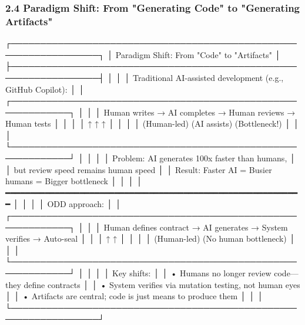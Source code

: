 \documentclass[
]{article}
\newenvironment{Shaded}{}{}
\newcommand{\NormalTok}[1]{#1}
\begin{document}
\hypertarget{24-paradigm-shift-from-generating-code-to-generating-artifacts}{%
\subsubsection{2.4 Paradigm Shift: From "Generating Code" to "Generating
Artifacts"}\label{24-paradigm-shift-from-generating-code-to-generating-artifacts}}

\begin{Shaded}
\begin{Highlighting}[]
\NormalTok{┌─────────────────────────────────────────────────────────────────┐}
\NormalTok{│     Paradigm Shift: From "Code" to "Artifacts"                   │}
\NormalTok{├─────────────────────────────────────────────────────────────────┤}
\NormalTok{│                                                                  │}
\NormalTok{│  Traditional AI{-}assisted development (e.g., GitHub Copilot):    │}
\NormalTok{│  ┌────────────────────────────────────────────────────────────┐ │}
\NormalTok{│  │  Human writes → AI completes → Human reviews → Human tests │ │}
\NormalTok{│  │       ↑             ↑              ↑                       │ │}
\NormalTok{│  │   (Human{-}led)   (AI assists)  (Bottleneck!)               │ │}
\NormalTok{│  └────────────────────────────────────────────────────────────┘ │}
\NormalTok{│                                                                  │}
\NormalTok{│  Problem: AI generates 100x faster than humans,                 │}
\NormalTok{│          but review speed remains human speed                   │}
\NormalTok{│  Result: Faster AI = Busier humans = Bigger bottleneck          │}
\NormalTok{│                                                                  │}
\NormalTok{│  ━━━━━━━━━━━━━━━━━━━━━━━━━━━━━━━━━━━━━━━━━━━━━━━━━━━━━━━━━━━━  │}
\NormalTok{│                                                                  │}
\NormalTok{│  ODD approach:                                                   │}
\NormalTok{│  ┌────────────────────────────────────────────────────────────┐ │}
\NormalTok{│  │  Human defines contract → AI generates → System verifies → Auto{-}seal │}
\NormalTok{│  │       ↑                                    ↑               │ │}
\NormalTok{│  │   (Human{-}led)                      (No human bottleneck)   │ │}
\NormalTok{│  └────────────────────────────────────────────────────────────┘ │}
\NormalTok{│                                                                  │}
\NormalTok{│  Key shifts:                                                    │}
\NormalTok{│  • Humans no longer review code—they define contracts           │}
\NormalTok{│  • System verifies via mutation testing, not human eyes         │}
\NormalTok{│  • Artifacts are central; code is just means to produce them    │}
\NormalTok{│                                                                  │}
\NormalTok{└─────────────────────────────────────────────────────────────────┘}
\end{Highlighting}
\end{Shaded}
\end{document}
